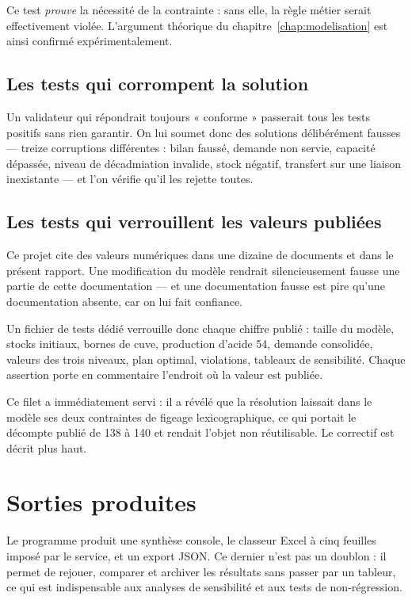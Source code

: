 Ce test \emph{prouve} la nécessité de la contrainte  : sans elle, la règle métier
serait effectivement violée. L'argument théorique du
chapitre~\ref{chap:modelisation} est ainsi confirmé expérimentalement.

\subsection{Les tests qui corrompent la solution}

Un validateur qui répondrait toujours « conforme » passerait tous les tests positifs sans
rien garantir. On lui soumet donc des solutions délibérément fausses --- treize corruptions
différentes : bilan faussé, demande non servie, capacité dépassée, niveau de décadmiation
invalide, stock négatif, transfert sur une liaison inexistante --- et l'on vérifie qu'il les
rejette toutes.

\subsection{Les tests qui verrouillent les valeurs publiées}
\label{sec:tests-valeurs}

Ce projet cite des valeurs numériques dans une dizaine de documents et dans le présent
rapport. Une modification du modèle rendrait silencieusement fausse une partie de cette
documentation --- et une documentation fausse est pire qu'une documentation absente, car on
lui fait confiance.

Un fichier de tests dédié verrouille donc chaque chiffre publié : taille du modèle, stocks
initiaux, bornes de cuve, production d'acide 54, demande consolidée, valeurs des trois
niveaux, plan optimal, violations, tableaux de sensibilité. Chaque assertion porte en
commentaire l'endroit où la valeur est publiée.

\begin{encadre}
Ce filet a immédiatement servi : il a révélé que la résolution laissait dans le modèle ses
deux contraintes de figeage lexicographique, ce qui portait le décompte publié de 138 à 140
et rendait l'objet non réutilisable. Le correctif est décrit plus haut.
\end{encadre}

\section{Sorties produites}

Le programme produit une synthèse console, le classeur Excel à cinq feuilles imposé par le
service, et un export JSON. Ce dernier n'est pas un doublon : il permet de rejouer, comparer
et archiver les résultats sans passer par un tableur, ce qui est indispensable aux analyses
de sensibilité et aux tests de non-régression.

